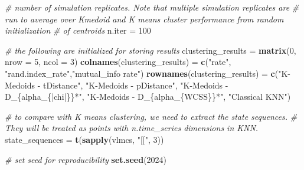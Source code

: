 \documentclass[
]{article}
\newenvironment{Shaded}{\begin{snugshade}}{\end{snugshade}}
\newcommand{\AttributeTok}[1]{\textcolor[rgb]{0.13,0.29,0.53}{#1}}
\newcommand{\CommentTok}[1]{\textcolor[rgb]{0.56,0.35,0.01}{\textit{#1}}}
\newcommand{\DecValTok}[1]{\textcolor[rgb]{0.00,0.00,0.81}{#1}}
\newcommand{\FunctionTok}[1]{\textcolor[rgb]{0.13,0.29,0.53}{\textbf{#1}}}
\newcommand{\NormalTok}[1]{#1}
\newcommand{\OtherTok}[1]{\textcolor[rgb]{0.56,0.35,0.01}{#1}}
\newcommand{\StringTok}[1]{\textcolor[rgb]{0.31,0.60,0.02}{#1}}
\begin{document}
\begin{Shaded}
\begin{Highlighting}[]
\CommentTok{\# number of simulation replicates.  Note that multiple simulation replicates are }
\CommentTok{\# run to average over Kmedoid and K means cluster performance from random initialization }
\CommentTok{\# of centroids }
\NormalTok{n.iter }\OtherTok{=} \DecValTok{100}

\CommentTok{\# the following are initialized for storing results}
\NormalTok{clustering\_results }\OtherTok{=} \FunctionTok{matrix}\NormalTok{(}\DecValTok{0}\NormalTok{, }\AttributeTok{nrow =} \DecValTok{5}\NormalTok{, }\AttributeTok{ncol =} \DecValTok{3}\NormalTok{)}
\FunctionTok{colnames}\NormalTok{(clustering\_results) }\OtherTok{=} \FunctionTok{c}\NormalTok{(}\StringTok{"rate"}\NormalTok{, }\StringTok{"rand.index\_rate"}\NormalTok{,}\StringTok{"mutual\_info rate"}\NormalTok{)}
\FunctionTok{rownames}\NormalTok{(clustering\_results) }\OtherTok{=} \FunctionTok{c}\NormalTok{(}\StringTok{"K{-}Medoids {-} tDistance"}\NormalTok{, }
                                 \StringTok{"K{-}Medoids {-} pDistance"}\NormalTok{,}
                                 \StringTok{"K{-}Medoids {-} D\_\{alpha\_\{|chi|\}\}*"}\NormalTok{, }
                                 \StringTok{"K{-}Medoids {-} D\_\{alpha\_\{WCSS\}\}*"}\NormalTok{, }
                                 \StringTok{"Classical KNN"}\NormalTok{)}



\CommentTok{\# to compare with K means clustering, we need to extract the state sequences.  }
\CommentTok{\# They will be treated as points with n.time\_series dimensions in KNN. }
\NormalTok{state\_sequences }\OtherTok{=} \FunctionTok{t}\NormalTok{(}\FunctionTok{sapply}\NormalTok{(vlmcs, }\StringTok{"[["}\NormalTok{, }\DecValTok{3}\NormalTok{))}

\CommentTok{\# set seed for reproducibility }
\FunctionTok{set.seed}\NormalTok{(}\DecValTok{2024}\NormalTok{)}



\end{Highlighting}
\end{Shaded}
\end{document}
